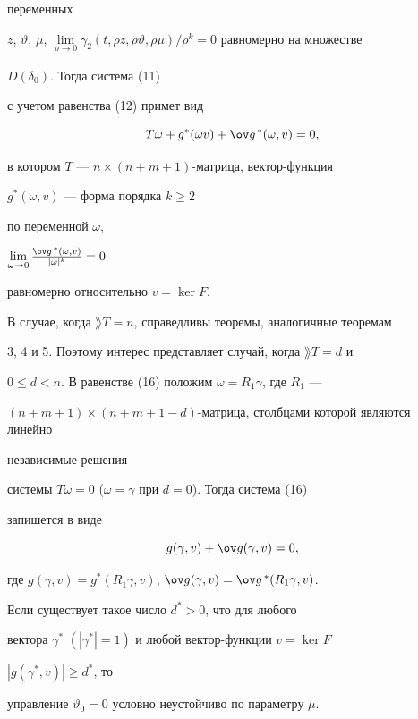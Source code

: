 переменных 


$z$, $\vartheta$, $\mu$, $\lim\limits_{\rho\to0}\gamma_2(t,\rho 


z,\rho\vartheta,\rho\mu)/\rho^k=0$ равномерно на множестве 


$D(\delta_0)$. Тогда система (11) 


с учетом равенства (12) примет вид 


\begin{equation} 


T\omega+g^*(\omega v)+\ov g^{\,*}(\omega,v)=0, 


\end{equation} 


в котором $T$ --- $n\times(n{+}m{+}1)$-матрица, вектор-функция 


$g^*(\omega,v)$ --- форма порядка $k\ge2$ 


по переменной $\omega$, 


$\lim\limits_{\omega\to0}\frac{\ov g^{\,*}(\omega,v)}{|\omega|^k}=0$ 


равномерно относительно $v=\ker F$. 


 


В случае, когда $\rang T=n$, справедливы теоремы, аналогичные теоремам 


3, 4 и 5. Поэтому интерес представляет случай, когда $\rang T=d$ и 


$0\le d<n$. В равенстве (16) положим $\omega=R_1\gamma$, где $R_1$ --- 


$(n+m+1)\times(n+m+1-d)$-матрица, столбцами которой являются линейно 


независимые решения 


системы $T\omega=0$ ($\omega=\gamma$ при $d=0$). Тогда система (16) 


запишется в виде 


\begin{equation} 


g(\gamma,v)+\ov g(\gamma,v)=0, 


\end{equation} 


где $g(\gamma,v)=g^*(R_1\gamma,v)$, $\ov g(\gamma,v)=\ov 


g^{\,*}(R_1\gamma,v)$. 


 


\begin{thm} 


Если существует такое число $d^*>0$, что для любого 


вектора $\gamma^*$ $(|\gamma^*|=1)$ и любой вектор-функции $v=\ker F$\; 


$|g(\gamma^*,v)|\ge d^*$, то 


управление $\vartheta_0=0$ условно неустойчиво по параметру $\mu$. 


\end{thm} 


